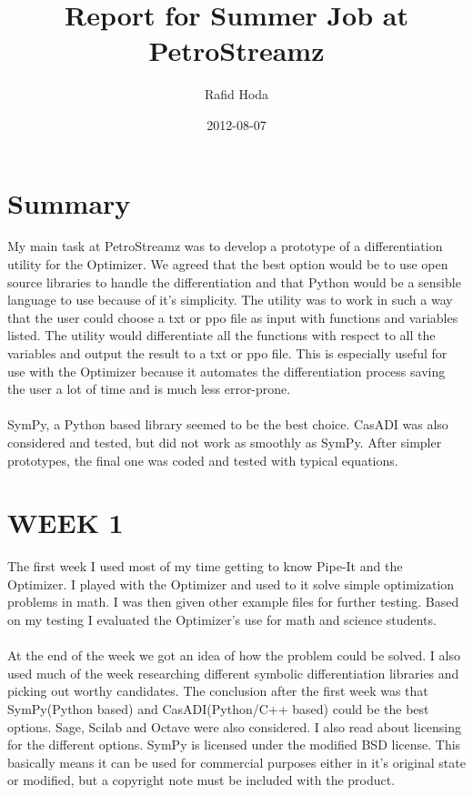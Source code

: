 \documentclass[]{article}
\title{Report for Summer Job at PetroStreamz}
\author{Rafid Hoda}
\date{2012-08-07}
\begin{document}
\ifpdf
{}
\else
{}
\fi

\maketitle

\section*{Summary}
My main task at PetroStreamz was to develop a prototype of a differentiation utility for the Optimizer. We agreed that the best option would be to use open source libraries to handle the differentiation and that Python would be a sensible language to use because of it's simplicity. The utility was to work in such a way that the user could choose a txt or ppo file as input with functions and variables listed. The utility would differentiate all the functions with respect to all the variables and output the result to a txt or ppo file. This is especially useful for use with the Optimizer because it automates the differentiation process saving the user a lot of time and is much less error-prone.
\\\\
SymPy, a Python based library seemed to be the best choice. CasADI was also considered and tested, but did not work as smoothly as SymPy. After simpler prototypes, the final one was coded and tested with typical equations.

\section*{WEEK 1}
The first week I used most of my time getting to know Pipe-It and the Optimizer. I played with the Optimizer and used to it solve simple optimization problems in math. I was then given other example files for further testing. Based on my testing I evaluated the Optimizer's use for math and science students.
\\\\
At the end of the week we got an idea of how the problem could be solved. I also used much of the week researching different symbolic differentiation libraries and picking out worthy candidates. The conclusion after the first week was that SymPy(Python based) and CasADI(Python/C++ based) could be the best options. Sage, Scilab and Octave were also considered. I also read about licensing for the different options. SymPy is licensed under the modified BSD license. This basically means it can be used for commercial purposes either in it's original state or modified, but a copyright note must be included with the product.
\end{document}
